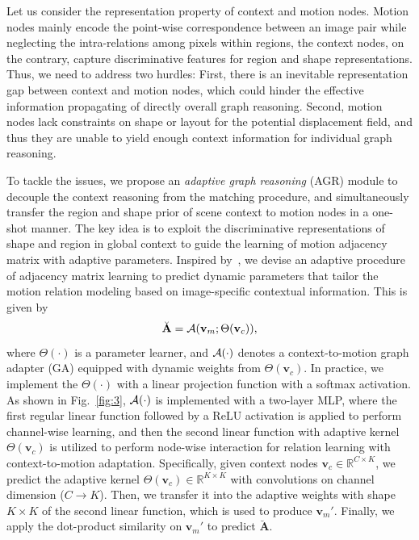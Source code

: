 \documentclass[letterpaper]{article} %
\begin{document}
Let us consider the representation property of context and motion nodes. Motion nodes mainly encode the point-wise correspondence between an image pair while neglecting the intra-relations among pixels within regions, the context nodes, on the contrary, capture discriminative features for region and shape representations. Thus, we need to address two hurdles: First,
there is an inevitable representation gap between context and motion nodes, which could hinder the effective information propagating of directly overall graph reasoning. Second, motion nodes lack constraints on shape or layout for the potential displacement field, and thus they are unable to yield enough context information for individual graph reasoning.

To tackle the issues, we propose an {\em adaptive graph reasoning} (AGR) module to decouple the context reasoning from the matching procedure, and simultaneously transfer the region and shape prior of scene context to motion nodes in a one-shot manner. The key idea is to exploit the discriminative representations of shape and region in global context to guide the learning of motion adjacency matrix with adaptive parameters. Inspired by~\cite{Bertinetto2016LearningFO}, we devise an adaptive procedure of adjacency matrix learning to predict dynamic parameters that tailor the motion relation modeling based on image-specific contextual information. This is given by
\begin{equation}
	\breve{\mathbf A} = {\cal A}({\mathbf v}_m ; \Theta({\mathbf v}_c)),
\end{equation}
where $\Theta(\cdot)$ is a parameter learner, and ${\cal A}(\cdot)$ denotes a context-to-motion graph adapter (GA) equipped with dynamic weights from $\Theta({\mathbf v}_c)$. In practice, we implement the $\Theta(\cdot)$ with a linear projection function with a softmax activation. As shown in Fig.~\ref{fig:3}, ${\cal A}(\cdot)$ is implemented with a two-layer MLP, where the first regular linear function followed by a ReLU activation is applied to perform channel-wise learning, and then the second linear function with adaptive kernel $\Theta({\mathbf v}_c)$ is utilized to perform node-wise interaction for relation learning with context-to-motion adaptation. Specifically, given context nodes ${\mathbf v}_c \in \mathbb{R}^{C \times K}$, we predict the adaptive kernel $\Theta({\mathbf v}_c) \in \mathbb{R}^{K \times K}$ with convolutions on channel dimension ($C \rightarrow K$). Then, we transfer it into the adaptive weights with shape $K \times K$ of the second linear function, which is used to produce ${{\mathbf v}_m}'$. Finally, we apply the dot-product similarity on ${{\mathbf v}_m}'$ to predict $\breve{\mathbf A}$.
\end{document}
